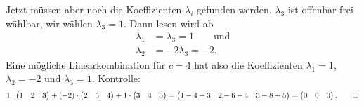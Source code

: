 \begin{loesung}
Jetzt müssen aber noch die Koeffizienten $\lambda_i$ gefunden werden.
$\lambda_3$ ist offenbar frei wählbar, wir wählen $\lambda_3=1$.
Dann lesen wird ab
\begin{align*}
\lambda_1 &= \lambda_3=1\qquad\text{und}\\
\lambda_2 &= -2\lambda_3=-2.
\end{align*}
Eine mögliche Linearkombination für $c=4$ hat also die Koeffizienten
$\lambda_1=1$,
$\lambda_2=-2$
und
$\lambda_3=1$.
Kontrolle:
\[
1\cdot\begin{pmatrix}1&2&3\end{pmatrix}
+
(-2)\cdot \begin{pmatrix}2&3&4\end{pmatrix}
+
1\cdot\begin{pmatrix}3&4&5\end{pmatrix}
=
\begin{pmatrix}
1-4+3& 2-6+4&3-8+5
\end{pmatrix}
=
\begin{pmatrix}0&0&0\end{pmatrix}.
\qedhere
\]
\end{loesung}

